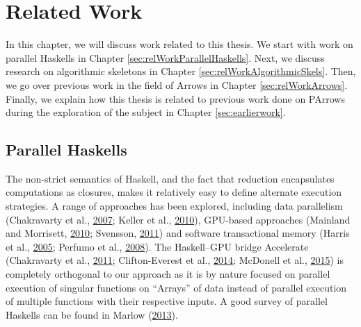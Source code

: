 \documentclass[paper=A4,twoside=true,openright,parskip=full,chapterprefix=true,headings=normal,bibliography=totoc,listof=totoc,titlepage=on,captions=tableabove,draft=false,british]{scrreprt}%
\renewcommand{\enquote}[1]{{``}#1{''}}
\begin{document}
\hypertarget{related-work}{%
\chapter{Related Work}\label{related-work}}

\label{sec:related-work}

In this chapter, we will discuss work related to this thesis. We start
with work on parallel Haskells in Chapter
\ref{sec:relWorkParallelHaskells}. Next, we discuss research on
algorithmic skeletons in Chapter \ref{sec:relWorkAlgorithmicSkels}.
Then, we go over previous work in the field of Arrows in Chapter
\ref{sec:relWorkArrows}. Finally, we explain how this thesis is related
to previous work done on PArrows during the exploration of the subject
in Chapter \ref{sec:earlierwork}.

\hypertarget{parallel-haskells}{%
\section{Parallel Haskells}\label{parallel-haskells}}

\label{sec:relWorkParallelHaskells}

The non-strict semantics of Haskell, and the fact that reduction
encapsulates computations as closures, makes it relatively easy to
define alternate execution strategies. A range of approaches has been
explored, including data parallelism (Chakravarty et al.,
\protect\hyperlink{ref-Chakravarty2007}{2007}; Keller et al.,
\protect\hyperlink{ref-Keller:2010:RSP:1932681.1863582}{2010}),
GPU-based approaches (Mainland and Morrisett,
\protect\hyperlink{ref-Mainland:2010:NEC:2088456.1863533}{2010};
Svensson, \protect\hyperlink{ref-obsidian-phd}{2011}) and software
transactional memory (Harris et al.,
\protect\hyperlink{ref-Harris:2005:CMT:1065944.1065952}{2005}; Perfumo
et al., \protect\hyperlink{ref-Perfumo:2008:LST:1366230.1366241}{2008}).
The Haskell--GPU bridge Accelerate (Chakravarty et al.,
\protect\hyperlink{ref-Chakravarty:2011:AHA:1926354.1926358}{2011};
Clifton-Everest et al., \protect\hyperlink{ref-CMCK14}{2014}; McDonell
et al., \protect\hyperlink{ref-McDonell:2015:TRC:2887747.2804313}{2015})
is completely orthogonal to our approach as it is by nature focused on
parallel execution of singular functions on \enquote{Arrays} of data
instead of parallel execution of multiple functions with their
respective inputs. A good survey of parallel Haskells can be found in
Marlow (\protect\hyperlink{ref-marlow2013parallel}{2013}).
\end{document}
